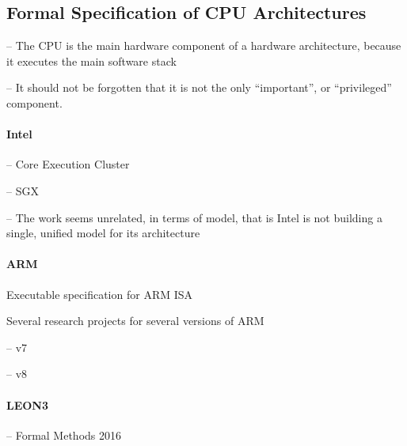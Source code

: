\subsection{Formal Specification of CPU Architectures}

\begin{compactitem}
\item[--] The CPU is the main hardware component of a hardware architecture,
  because it executes the main software stack
\item[--] It should not be forgotten that it is not the only ``important'', or
  ``privileged'' component.
\end{compactitem}

\paragraph{Intel}
%
\begin{compactitem}
\item[--] Core Execution Cluster\,\cite{kaivola2009formalintel}
\item[--] SGX\,\cite{leslie2015sgx}
\item[--] The work seems unrelated, in terms of model, that is Intel is not
  building a single, unified model for its architecture
\end{compactitem}

\paragraph{ARM}
%
\begin{compactitem}
\item Executable specification for ARM ISA
\item Several research projects for several versions of ARM
  \begin{compactitem}
  \item[--] v7\,\cite{fox2010armv7}
  \item[--] v8\,\cite{reid2016armv8}
  \end{compactitem}
\end{compactitem}

\paragraph{LEON3}
%
\begin{compactitem}
\item[--] Formal Methods 2016
\end{compactitem}

